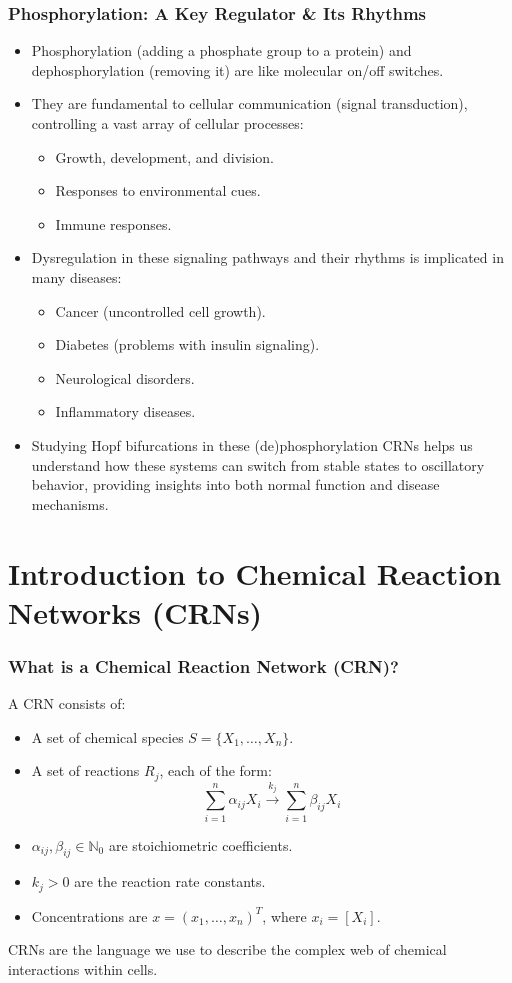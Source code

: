 \documentclass[aspectratio=169]{beamer}
\begin{document}
\begin{frame}{\insertsectionhead}
	\frametitle{Phosphorylation: A Key Regulator \& Its Rhythms}
	\begin{itemize}
		\item \alert{Phosphorylation} (adding a phosphate group to a protein) and \alert{dephosphorylation} (removing it) are like molecular on/off switches.
		\item They are fundamental to \alert{cellular communication (signal transduction)}, controlling a vast array of cellular processes:
			\begin{itemize}
				\item Growth, development, and division.
				\item Responses to environmental cues.
				\item Immune responses.
			\end{itemize}
		\item \alert{Dysregulation} in these signaling pathways and their rhythms is implicated in many diseases:
			\begin{itemize}
				\item Cancer (uncontrolled cell growth).
				\item Diabetes (problems with insulin signaling).
				\item Neurological disorders.
				\item Inflammatory diseases.
			\end{itemize}
		\item Studying \alert{Hopf bifurcations} in these (de)phosphorylation CRNs helps us understand how these systems can switch from stable states to oscillatory behavior, providing insights into both normal function and disease mechanisms.
	\end{itemize}
\end{frame}

\section{Introduction to Chemical Reaction Networks (CRNs)}

\begin{frame}{\insertsectionhead}
	\frametitle{What is a Chemical Reaction Network (CRN)?}
	A CRN consists of:
	\begin{itemize}
		\item A set of chemical \alert{species} $S = \{X_1, \dots, X_n\}$.
		\item A set of \alert{reactions} $R_j$, each of the form:
			$$ \sum_{i=1}^{n} \alpha_{ij} X_i \xrightarrow{k_j} \sum_{i=1}^{n} \beta_{ij} X_i $$
		\item $\alpha_{ij}, \beta_{ij} \in \mathbb{N}_0$ are \alert{stoichiometric coefficients}.
		\item $k_j > 0$ are the \alert{reaction rate constants}.
		\item Concentrations are $x = (x_1, \dots, x_n)^T$, where $x_i = [X_i]$.
	\end{itemize}
	CRNs are the language we use to describe the complex web of chemical interactions within cells.
\end{frame}
\end{document}
